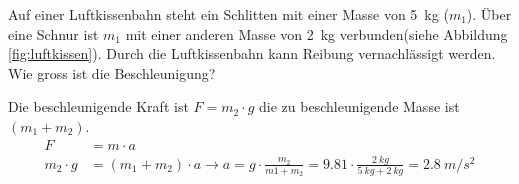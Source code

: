 
\begin{aufgabe}
	Auf einer Luftkissenbahn steht ein Schlitten mit einer Masse von \SI{5}{kg} ($m_1$). Über eine Schnur ist $m_1$ mit einer anderen Masse
	von \SI{2}{kg} verbunden(siehe Abbildung \ref{fig:luftkissen}).
	Durch die Luftkissenbahn kann Reibung vernachlässigt werden.
	Wie gross ist die Beschleunigung?
	\begin{loesung}
		Die beschleunigende Kraft ist $F=m_2\cdot g$ die zu beschleunigende Masse ist $(m_1 +m_2)$.
		\begin{align*}
			F&=m\cdot a\\
			m_2\cdot g &= (m_1+m_2)\cdot a \to a=g\cdot\frac{m_2}{m1+m_2}=\SI{9.81}\cdot\frac{\SI{2}{kg}}{\SI{5}{kg}+\SI{2}{kg}}=\SI{2.8}{m/s^2}
		\end{align*}
	\end{loesung}
\end{aufgabe}

